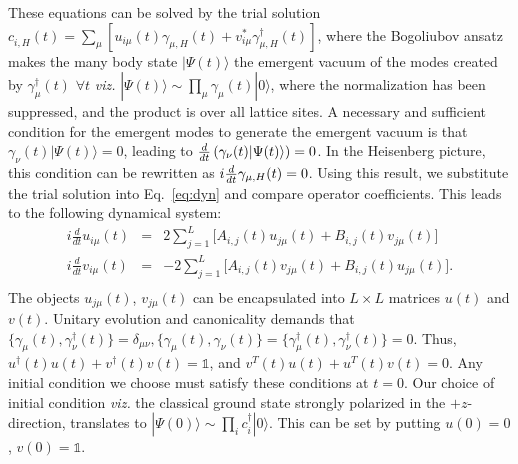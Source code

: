\documentclass[aps,prl, notitlepage]{revtex4-1}
\begin{document}
These equations can be solved by the trial solution $c^{\;}_{i,H}(t) = \sum_\mu \left[u_{i\mu}(t)\gamma_{\mu,H}(t)+v^\ast_{i\mu}\gamma^\dagger_{\mu,H}(t)\right]$, where the Bogoliubov ansatz makes the many body state $|\Psi(t)\rangle$ the emergent vacuum of the modes  created by $\gamma^\dagger_{\mu}(t)$ $\forall t$ \textit{viz.} $|\Psi(t)\rangle \sim \prod_\mu \gamma_\mu(t) |0\rangle$, where the normalization has been suppressed, and the product is over all lattice sites. A necessary and sufficient condition for the emergent modes to generate the emergent vacuum is that $\gamma_\nu(t)|\Psi(t)\rangle = 0$, leading to  $ {d\over dt} \left( \gamma_\nu(t)|\Psi(t)\rangle \right) = 0$. In the Heisenberg picture, this condition can be rewritten as $i{d\over dt}\gamma_{\mu,H}(t)=0$. Using this result, we substitute the trial solution into Eq.~\ref{eq:dyn} and compare operator coefficients. This leads to the following dynamical system:
\begin{eqnarray} 
\label{BdG_tdep:eqn}
i\frac{d}{dt}u_{i\mu}(t) &=&  {2} \sum_{j=1}^{L} \bigg[A_{i,j}(t)u_{j\mu}(t)+ B_{i,j}(t)v_{j\mu}(t) \bigg] \nonumber \\
i\frac{d}{dt}v_{i\mu}(t) &=& -{2}\sum_{j=1}^{L} \bigg[A_{i,j}(t)v_{j\mu}(t)+ B_{i,j}(t)u_{j\mu}(t) \bigg].\nonumber \\
\end{eqnarray}
The objects $u_{j\mu}(t)$, $v_{j\mu}(t)$ can be encapsulated into $L\times L$ matrices $u(t)$ and $v(t)$. Unitary evolution and canonicality demands that $\{\gamma_\mu(t),\gamma^\dagger_\nu(t)\}=\delta_{\mu\nu},\{\gamma_\mu(t),\gamma_\nu(t)\}=\{\gamma^\dagger_\mu(t),\gamma^\dagger_\nu(t)\}=0$. Thus, $u^\dagger(t) u(t) + v^\dagger(t) v(t) = \mathds{1}$, and $v^T(t)u(t)+u^T(t)v(t) = 0$.  Any initial condition we choose must satisfy these conditions at $t=0$. Our choice of initial condition \textit{viz.} the classical ground state strongly polarized in the $+z$-direction, translates to $|\Psi(0)\rangle \sim \prod_i c^\dagger_i |0\rangle$. This can be set by putting $u(0)=0$, $v(0)=\mathds{1}$.
\end{document}
